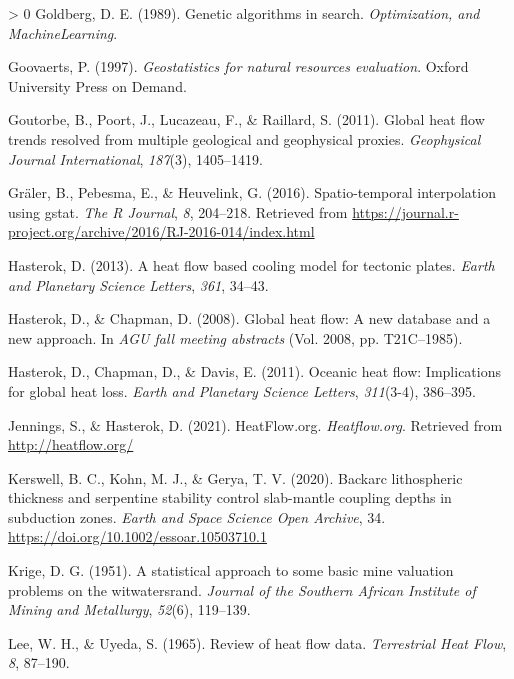 \documentclass[draft,linenumbers]{agujournal2018}
\newlength{\cslhangindent}
\newenvironment{CSLReferences}[3] %
 {%
  \setlength{\parindent}{0pt}
  \ifodd #1 \everypar{\setlength{\hangindent}{\cslhangindent}}\ignorespaces\fi
  \ifnum #2 > 0
  \setlength{\parskip}{#2\baselineskip}
  \fi
 }%
 {}
\begin{document}
\begin{CSLReferences}{1}{0}
\leavevmode\hypertarget{ref-goldberg1989}{}%
Goldberg, D. E. (1989). Genetic algorithms in search.
\emph{Optimization, and MachineLearning}.

\leavevmode\hypertarget{ref-goovaerts1997}{}%
Goovaerts, P. (1997). \emph{Geostatistics for natural resources
evaluation}. Oxford University Press on Demand.

\leavevmode\hypertarget{ref-goutorbe2011}{}%
Goutorbe, B., Poort, J., Lucazeau, F., \& Raillard, S. (2011). Global
heat flow trends resolved from multiple geological and geophysical
proxies. \emph{Geophysical Journal International}, \emph{187}(3),
1405--1419.

\leavevmode\hypertarget{ref-graler2016}{}%
Gräler, B., Pebesma, E., \& Heuvelink, G. (2016). Spatio-temporal
interpolation using gstat. \emph{The R Journal}, \emph{8}, 204--218.
Retrieved from
\url{https://journal.r-project.org/archive/2016/RJ-2016-014/index.html}

\leavevmode\hypertarget{ref-hasterok2013}{}%
Hasterok, D. (2013). A heat flow based cooling model for tectonic
plates. \emph{Earth and Planetary Science Letters}, \emph{361}, 34--43.

\leavevmode\hypertarget{ref-hasterok2008}{}%
Hasterok, D., \& Chapman, D. (2008). Global heat flow: A new database
and a new approach. In \emph{AGU fall meeting abstracts} (Vol. 2008, pp.
T21C--1985).

\leavevmode\hypertarget{ref-hasterok2011}{}%
Hasterok, D., Chapman, D., \& Davis, E. (2011). Oceanic heat flow:
Implications for global heat loss. \emph{Earth and Planetary Science
Letters}, \emph{311}(3-4), 386--395.

\leavevmode\hypertarget{ref-jennings2021}{}%
Jennings, S., \& Hasterok, D. (2021). HeatFlow.org. \emph{Heatflow.org}.
Retrieved from \url{http://heatflow.org/}

\leavevmode\hypertarget{ref-kerswell2020}{}%
Kerswell, B. C., Kohn, M. J., \& Gerya, T. V. (2020). Backarc
lithospheric thickness and serpentine stability control slab-mantle
coupling depths in subduction zones. \emph{Earth and Space Science Open
Archive}, 34. \url{https://doi.org/10.1002/essoar.10503710.1}

\leavevmode\hypertarget{ref-krige1951}{}%
Krige, D. G. (1951). A statistical approach to some basic mine valuation
problems on the witwatersrand. \emph{Journal of the Southern African
Institute of Mining and Metallurgy}, \emph{52}(6), 119--139.

\leavevmode\hypertarget{ref-lee1965}{}%
Lee, W. H., \& Uyeda, S. (1965). Review of heat flow data.
\emph{Terrestrial Heat Flow}, \emph{8}, 87--190.


\end{CSLReferences}
\end{document}
